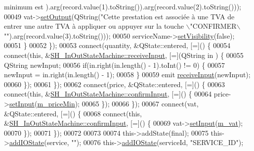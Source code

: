 \begin{DoxyCode}
{{       minimum est %
      ).arg(record.value(1).toString()).arg(record.value(2).toString()));
00049             vat->\hyperlink{classSH__DatabaseContentQuestionState_aff932cdd7974baeea9a477cf0abc5ace}{setOutput}(QString(\textcolor{stringliteral}{"Cette prestation est associée à une TVA de %
       entrer une autre TVA à appliquer ou appuyer sur la touche \(\backslash\)"CONFIRMER\(\backslash\)""}).arg(record.value(3).toString()));
00050             serviceName->\hyperlink{classSH__InOutState_a7706a2ea1367ab3416db27fa0f4794f7}{setVisibility}(\textcolor{keyword}{false});
00051         \}
00052     \});
00053     connect(quantity, &QState::entered, [=]() \{
00054         connect(\textcolor{keyword}{this}, &\hyperlink{classSH__InOutStateMachine_ab224e4a6ab99c15770bc63e1b8fdb771}{SH\_InOutStateMachine::receiveInput}, [=](QString in
      ) \{
00055             QString newInput;
00056             \textcolor{keywordflow}{if}(in.right(in.length() - 1).toInt() != 0) \{
00057                 newInput = in.right(in.length() - 1);
00058             \}
00059             emit \hyperlink{classSH__InOutStateMachine_ab224e4a6ab99c15770bc63e1b8fdb771}{receiveInput}(newInput);
00060         \});
00061     \});
00062     connect(price, &QState::entered, [=]() \{
00063         connect(\textcolor{keyword}{this}, &\hyperlink{classSH__InOutStateMachine_a0fb4c4d63ccb19df48f1e060d02d8ae3}{SH\_InOutStateMachine::confirmInput}, [=]() \{
00064             price->\hyperlink{classSH__QuestionState_a331222d371d9c97392f35c84a5ef43e1}{setInput}(\hyperlink{classSH__ServiceCharging_a44584a7ff1edd6ae03c4f77544136c13}{m\_priceMin});
00065         \});
00066     \});
00067     connect(vat, &QState::entered, [=]() \{
00068         connect(\textcolor{keyword}{this}, &\hyperlink{classSH__InOutStateMachine_a0fb4c4d63ccb19df48f1e060d02d8ae3}{SH\_InOutStateMachine::confirmInput}, [=]() \{
00069             vat->\hyperlink{classSH__QuestionState_a331222d371d9c97392f35c84a5ef43e1}{setInput}(\hyperlink{classSH__ServiceCharging_ae2fa75c56883dc4af6b0bbcbb86d0861}{m\_vat});
00070         \});
00071     \});
00072 
00073 
00074     this->addState(\textcolor{keyword}{final});
00075     this->\hyperlink{classSH__InOutStateMachine_ad6b778d052f741daee720c047059ce0e}{addIOState}(service, \textcolor{stringliteral}{""});
00076     this->\hyperlink{classSH__InOutStateMachine_ad6b778d052f741daee720c047059ce0e}{addIOState}(serviceId, \textcolor{stringliteral}{"SERVICE\_ID"});
}}
\end{DoxyCode}
